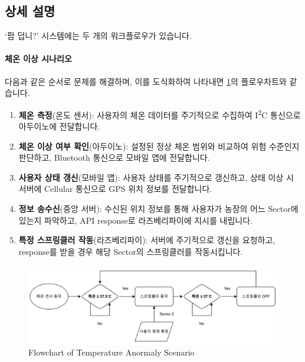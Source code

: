 \documentclass[12pt]{article}
\begin{document}
        \subsection{상세 설명}
            `팜 덥니?' 시스템에는 두 개의 워크플로우가 있습니다.
            \paragraph{체온 이상 시나리오}다음과 같은 순서로 문제를 해결하며, 이를 도식화하여 나타내면 \cref{flow1}의 플로우차트와 같습니다.
            \begin{enumerate}
                \item \textbf{체온 측정}(온도 센서): 사용자의 체온 데이터를 주기적으로 수집하여 I\textsuperscript{2}C 통신으로 아두이노에 전달합니다.
                \item \textbf{체온 이상 여부 확인}(아두이노): 설정된 정상 체온 범위와 비교하여 위험 수준인지 판단하고, Bluetooth 통신으로 모바일 앱에 전달합니다.
                \item \textbf{사용자 상태 갱신}(모바일 앱): 사용자 상태를 주기적으로 갱신하고, 상태 이상 시 서버에 Cellular 통신으로 GPS 위치 정보를 전달합니다.
                \item \textbf{정보 송수신}(중앙 서버): 수신된 위치 정보를 통해 사용자가 농장의 어느 Sector에 있는지 파악하고, API response로 라즈베리파이에 지시를 내립니다.
                \item \textbf{특정 스프링클러 작동}(라즈베리파이): 서버에 주기적으로 갱신을 요청하고, response를 받을 경우 해당 Sector의 스프링클러를 작동시킵니다.
            \end{enumerate}
            \begin{figure}[H]
                \centering
                \includegraphics[width=.8\linewidth]{flow1.png}
                \caption{Flowchart of Temperature Anormaly Scenario}
                \label{flow1}
            \end{figure}
\end{document}
